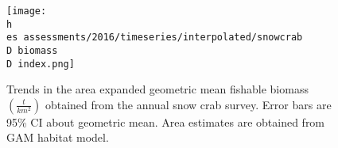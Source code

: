 \documentclass[11pt]{article}
\newcommand{\D}{.}
\newcommand{\h}{\string~}
\newcommand{\es}{bio.data/bio.snowcrab/}
\begin{document}



\begin{figure}
\centering
\texttt{[image: \\h \\es assessments/2016/timeseries/interpolated/snowcrab\\D biomass\\D index.png]}\\ 
\caption{Trends in the area expanded geometric mean fishable biomass $\left(\tfrac{t}{km^2}\right)$ obtained from the annual snow crab survey. Error bars are 95\% CI about geometric mean. Area estimates are obtained from GAM habitat model.}
\end{figure} %
\clearpage





\end{document}
